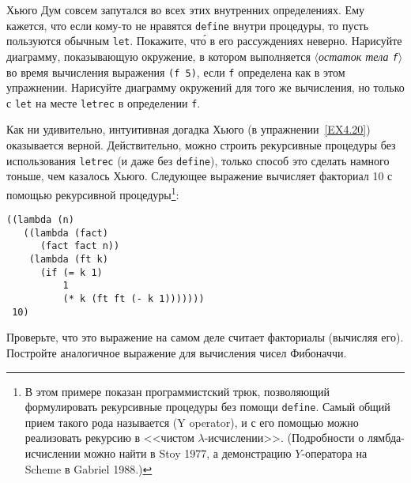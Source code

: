 \begin{exercise}{4.20}
\begin{plainenum}
\item
Хьюго Дум совсем запутался во всех этих
внутренних определениях.  Ему кажется, что если кому-то не нравятся
{\tt define} внутри процедуры, то пусть пользуются обычным
{\tt let}.  Покажите, чт\'о в его рассуждениях неверно. Нарисуйте
диаграмму, показывающую окружение, в котором выполняется
\textit{$\langle$остаток тела {\tt f}$\rangle$} во время вычисления
выражения {\tt (f 5)}, если {\tt f} определена как в
этом упражнении.  Нарисуйте диаграмму окружений для того же
вычисления, но только с {\tt let} на месте {\tt letrec}
в определении {\tt f}.
\end{plainenum}
\end{exercise}

\begin{exercise}{4.21}%
\label{EX4.21}%
Как ни удивительно, интуитивная догадка Хьюго (в
упражнении~\ref{EX4.20}) оказывается верной.
Действительно, можно
строить рекурсивные процедуры без использования {\tt letrec} (и
даже без {\tt define}), только способ это сделать намного
тоньше, чем казалось Хьюго.
Следующее выражение вычисляет факториал 10 с
помощью рекурсивной процедуры\footnote{В этом примере показан 
программистский трюк,
позволяющий формулировать рекурсивные процедуры без помощи
{\tt define}.  Самый общий прием такого рода называется 
 (Y operator), и с его помощью 
можно реализовать
рекурсию в <<чистом $\lambda$-исчислении>>. (Подробности о лямбда-исчислении
можно найти в Stoy 1977,
а демонстрацию $Y$-оператора
на Scheme в Gabriel 1988.)}:

\begin{Verbatim}[fontsize=\small]
((lambda (n)
   ((lambda (fact)
      (fact fact n))
    (lambda (ft k)
      (if (= k 1)
          1
          (* k (ft ft (- k 1)))))))
 10)
\end{Verbatim}

\begin{plainenum}


\item
Проверьте, что это выражение на самом деле считает факториалы
(вычисляя его).  Постройте аналогичное выражение для
вычисления чисел Фибоначчи.


\end{plainenum}
\end{exercise}
